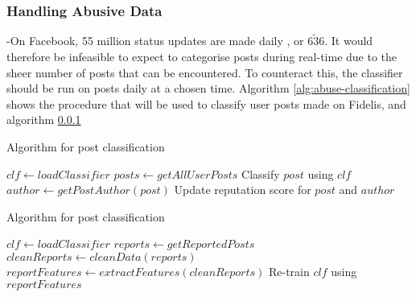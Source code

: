 \subsubsection{Handling Abusive Data}
-On Facebook, 55 million status updates are made daily \cite{kissmetrics:fb-stats}, or $\tilde{636}$. It would therefore be infeasible to expect to categorise posts during real-time due to the sheer number of posts that can be encountered. To counteract this, the classifier should be run on posts daily at a chosen time. 
Algorithm \ref{alg:abuse-classification} shows the procedure that will be used to classify user posts made on Fidelis, and algorithm \ref{}
\begin{algorithm}
\caption{Algorithm for post classification}
\label{alg:abuse-classification}
\begin{algorithmic}[1]
\State $clf\gets loadClassifier$
\State $posts\gets getAllUserPosts$
	\State Classify $post$ using $clf$
		\State $author\gets getPostAuthor(post)$
		\State Update reputation score for $post$ and $author$
	\EndIf
\EndFor
\end{algorithmic}
\end{algorithm}

\begin{algorithm}
\caption{Algorithm for post classification}
\label{alg:abuse-retrain}
\begin{algorithmic}[1]
\State $clf\gets loadClassifier$
\State $reports\gets getReportedPosts$
\State $cleanReports\gets cleanData(reports)$
\State $reportFeatures\gets extractFeatures(cleanReports)$
\State Re-train $clf$ using $reportFeatures$
\end{algorithmic}
\end{algorithm}